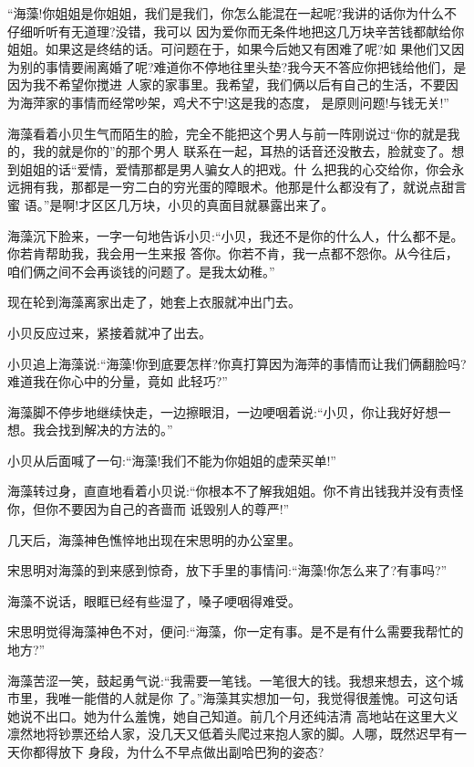 \documentclass[11pt,a4paper,onecolumn]{article}
\begin{document}
``海藻!你姐姐是你姐姐，我们是我们，你怎么能混在一起呢?我讲的话你为什么不仔细听听有无道理?没错，我可以
因为爱你而无条件地把这几万块辛苦钱都献给你姐姐。如果这是终结的话。可问题在于，如果今后她又有困难了呢?如
果他们又因为别的事情要闹离婚了呢?难道你不停地往里头垫?我今天不答应你把钱给他们，是因为我不希望你搅进
人家的家事里。我希望，我们俩以后有自己的生活，不要因为海萍家的事情而经常吵架，鸡犬不宁!这是我的态度，
是原则问题!与钱无关!''

海藻看着小贝生气而陌生的脸，完全不能把这个男人与前一阵刚说过``你的就是我的，我的就是你的''的那个男人
联系在一起，耳热的话音还没散去，脸就变了。想到姐姐的话\myrule ``爱情，爱情那都是男人骗女人的把戏。什
么把我的心交给你，你会永远拥有我，那都是一穷二白的穷光蛋的障眼术。他那是什么都没有了，就说点甜言蜜
语。''是啊!才区区几万块，小贝的真面目就暴露出来了。

海藻沉下脸来，一字一句地告诉小贝:``小贝，我还不是你的什么人，什么都不是。你若肯帮助我，我会用一生来报
答你。你若不肯，我一点都不怨你。从今往后，咱们俩之间不会再谈钱的问题了。是我太幼稚。''

现在轮到海藻离家出走了，她套上衣服就冲出门去。

小贝反应过来，紧接着就冲了出去。

小贝追上海藻说:``海藻!你到底要怎样?你真打算因为海萍的事情而让我们俩翻脸吗?难道我在你心中的分量，竟如
此轻巧?''

海藻脚不停步地继续快走，一边擦眼泪，一边哽咽着说:``小贝，你让我好好想一想。我会找到解决的方法的。''

小贝从后面喊了一句:``海藻!我们不能为你姐姐的虚荣买单!''

海藻转过身，直直地看着小贝说:``你根本不了解我姐姐。你不肯出钱我并没有责怪你，但你不要因为自己的吝啬而
诋毁别人的尊严!''

几天后，海藻神色憔悴地出现在宋思明的办公室里。

宋思明对海藻的到来感到惊奇，放下手里的事情问:``海藻!你怎么来了?有事吗?''

海藻不说话，眼眶已经有些湿了，嗓子哽咽得难受。

宋思明觉得海藻神色不对，便问:``海藻，你一定有事。是不是有什么需要我帮忙的地方?''

海藻苦涩一笑，鼓起勇气说:``我需要一笔钱。一笔很大的钱。我想来想去，这个城市里，我唯一能借的人就是你
了。''海藻其实想加一句，我觉得很羞愧。可这句话她说不出口。她为什么羞愧，她自己知道。前几个月还纯洁清
高地站在这里大义凛然地将钞票还给人家，没几天又低着头爬过来抱人家的脚。人哪，既然迟早有一天你都得放下
身段，为什么不早点做出副哈巴狗的姿态?
\end{document}
